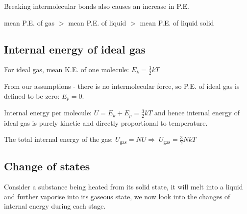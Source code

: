 \documentclass[a4paper,12pt]{book}
\newcommand{\RA}{\Rightarrow\;}
\newcommand{\tcbhighmath}[1]{\boxed{#1}}
\begin{document}
Breaking intermolecular bonds also causes an increase in P.E.

mean P.E. of gas $>$ mean P.E. of liquid $>$ mean P.E. of liquid solid

\subsection{Internal energy of ideal gas}

For ideal gas, mean K.E. of one molecule: $E_k = \frac{3}{2}kT$

From our assumptions - there is no intermolecular force, so P.E. of ideal gas is defined to be zero: $E_p = 0$.

Internal energy per molecule: $U = E_k + E_p = \frac{3}{2}kT$ and hence internal energy of ideal gas is purely kinetic and directly proportional to temperature. 

The total internal energy of the gas: $U_\text{gas} = NU \RA \tcbhighmath{U_\text{gas} = \frac{3}{2}NkT}$

\subsection{Change of states}

Consider a substance being heated from its solid state, it will melt into a liquid and further vaporise into its gaseous state, we now look into the changes of internal energy during each stage.

\begin{figure}[ht]
\centering
{}
\end{figure}
\end{document}
